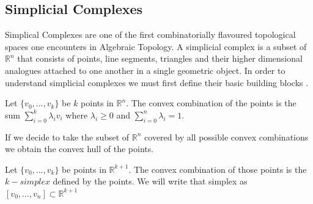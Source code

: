 \subsection{Simplicial Complexes}

Simplical Complexes are one of the first combinatorially flavoured topological spaces one encounters in Algebraic Topology. A simplicial complex is a subset of $\mathbb{R}^n$ that consists of points, line segments, triangles and their higher dimensional analogues attached to one another in a single geometric object. In order to understand simplicial complexes we must first define their basic building blocks \cite{comp-topo}.

\begin{defn} Let $\{v_0, ..., v_k\}$ be $k$ points in $\mathbb{R}^n$. The convex combination of the points is the sum $\sum_{i=0}^k{\lambda_iv_i}$ where $\lambda_i \ge 0$ and $\sum_{i=0}^n{\lambda_i} = 1$.  \end{defn}

If we decide to take the subset of $\mathbb{R}^n$ covered by all possible convex combinations we obtain the convex hull of the points.

\begin{defn} Let $\{v_0, ..., v_k\}$ be points in $\mathbb{R}^{k+1}$. The convex combination of those points is the $k-simplex$ defined by the points. We will write that simplex as $[v_0, ..., v_n] \subset \mathbb{R}^{k+1}$  \end{defn}

